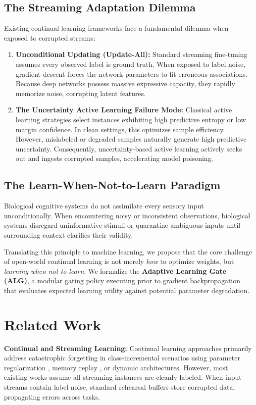 \documentclass[journal,10pt,twocolumn]{article}
\begin{document}
\subsection{The Streaming Adaptation Dilemma}
Existing continual learning frameworks face a fundamental dilemma when exposed to corrupted streams:
\begin{enumerate}
    \item \textbf{Unconditional Updating (Update-All):} Standard streaming fine-tuning \cite{lange2022continual} assumes every observed label is ground truth. When exposed to label noise, gradient descent forces the network parameters to fit erroneous associations. Because deep networks possess massive expressive capacity, they rapidly memorize noise, corrupting latent features.
    \item \textbf{The Uncertainty Active Learning Failure Mode:} Classical active learning strategies \cite{settles2009active,lewis1994sequential} select instances exhibiting high predictive entropy or low margin confidence. In clean settings, this optimizes sample efficiency. However, mislabeled or degraded samples naturally generate high predictive uncertainty. Consequently, uncertainty-based active learning actively seeks out and ingests corrupted samples, accelerating model poisoning.
\end{enumerate}

\subsection{The Learn-When-Not-to-Learn Paradigm}
Biological cognitive systems do not assimilate every sensory input unconditionally. When encountering noisy or inconsistent observations, biological systems disregard uninformative stimuli or quarantine ambiguous inputs until surrounding context clarifies their validity.

Translating this principle to machine learning, we propose that the core challenge of open-world continual learning is not merely \textit{how} to optimize weights, but \textit{learning when not to learn}. We formalize the \textbf{Adaptive Learning Gate (ALG)}, a modular gating policy executing prior to gradient backpropagation that evaluates expected learning utility against potential parameter degradation.

\section{Related Work}
\textbf{Continual and Streaming Learning:} Continual learning approaches primarily address catastrophic forgetting in class-incremental scenarios using parameter regularization \cite{kirkpatrick2017overcoming}, memory replay \cite{lopez2017gradient}, or dynamic architectures. However, most existing works assume all streaming instances are cleanly labeled. When input streams contain label noise, standard rehearsal buffers store corrupted data, propagating errors across tasks.
\end{document}
